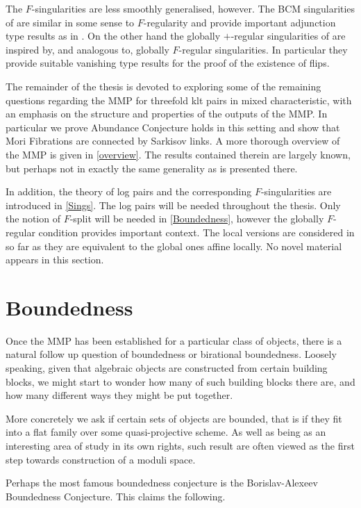 \documentclass[a4paper,12pt]{book}
\let \OldSection \section
\renewcommand{\section}[1]{\OldSection{#1} \thispagestyle{section}}
\begin{document}
	The $F$-singularities are less smoothly generalised, however. The BCM singularities of \cite{ma2021singularities} are similar in some sense to $F$-regularity and provide important adjunction type results as in \cite{ma2019analog}. On the other hand the globally $+$-regular singularities of \cite{bhatt2020} are inspired by, and analogous to, globally $F$-regular singularities. In particular they provide suitable vanishing type results for the proof of the existence of flips. 
	
	The remainder of the thesis is devoted to exploring some of the remaining questions regarding the MMP for threefold klt pairs in mixed characteristic, with an emphasis on the structure and properties of the outputs of the MMP. In particular we prove Abundance Conjecture holds in this setting and show that Mori Fibrations are connected by Sarkisov links. A more thorough overview of the MMP is given in \autoref{overview}. The results contained therein are largely known, but perhaps not in exactly the same generality as is presented there.
	
	In addition, the theory of log pairs and the corresponding $F$-singularities are introduced in \autoref{Sings}. The log pairs will be needed throughout the thesis. Only the notion of $F$-split will be needed in \autoref{Boundedness}, however the globally $F$-regular condition provides important context. The local versions are considered in so far as they are equivalent to the global ones affine locally. No novel material appears in this section.
	
	\section{Boundedness}
	
	Once the MMP has been established for a particular class of objects, there is a natural follow up question of boundedness or birational boundedness. Loosely speaking, given that algebraic objects are constructed from certain building blocks, we might start to wonder how many of such building blocks there are, and how many different ways they might be put together.
	
	More concretely we ask if certain sets of objects are bounded, that is if they fit into a flat family over some quasi-projective scheme. As well as being as an interesting area of study in its own rights, such result are often viewed as the first step towards construction of a moduli space.
	
	Perhaps the most famous boundedness conjecture is the Borislav-Alexeev Boundedness Conjecture. This claims the following.
	
\end{document}
